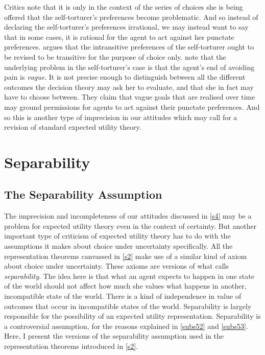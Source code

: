 Critics note that it is only in the context of the series of choices she is being offered that the self-torturer's preferences become problematic. And so instead of declaring the self-torturer's preferences irrational, we may instead want to say that in some cases, it is rational for the agent to act against her punctate preferences. \citet{Andreou2006} argues that the intransitive preferences of the self-torturer ought to be revised to be transitive for the purpose of choice only. \citet{TenenbaumRaffman2012} note that the underlying problem in the self-torturer's case is that the agent's end of avoiding pain is {\em vague}. It is not precise enough to distinguish between all the different outcomes the decision theory may ask her to evaluate, and that she in fact may have to choose between. They claim that vague goals that are realised over time may ground permissions for agents to act against their punctate preferences. And so this is another type of imprecision in our attitudes which may call for a revision of standard expected utility theory.

\section{Separability}\label{s5}

\subsection{The Separability Assumption}\label{subs51}

The imprecision and incompleteness of our attitudes discussed in \autoref{s4} may be a problem for expected utility theory even in the context of certainty. But another important type of criticism of expected utility theory has to do with the assumptions it makes about choice under uncertainty specifically. All the representation theorems canvassed in \autoref{s2} make use of a similar kind of axiom about choice under uncertainty. These axioms are versions of what \citet{Broome1991} calls {\em separability}. The idea here is that what an agent expects to happen in one state of the world should not affect how much she values what happens in another, incompatible state of the world. There is a kind of independence in value of outcomes that occur in incompatible states of the world. Separability is largely responsible for the possibility of an expected utility representation. Separability is a controversial assumption, for the reasons explained in \autoref{subs52} and \autoref{subs53}. Here, I present the versions of the separability assumption used in the representation theorems introduced in \autoref{s2}.

